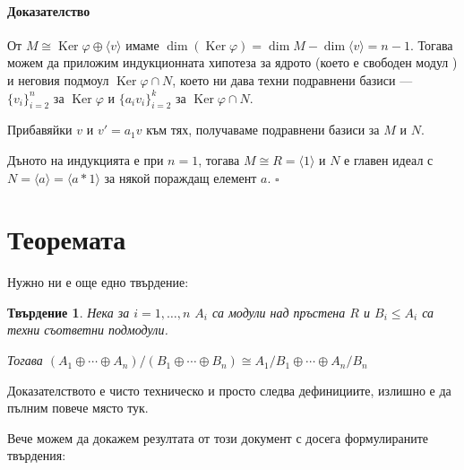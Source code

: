 \documentclass{article}
\newif\ifusemulticols
\theoremstyle{definition}
\theoremstyle{remark}
\theoremstyle{plain}
\theoremstyle{plain}
\newtheorem{prop}[theorem]{Твърдение}
\newenvironment{mymulticols}
    { \ifusemulticols \begin{multicols}{2} \fi }
    { \ifusemulticols \end{multicols} \fi }
\newenvironment{myproof}{\paragraph{Доказателство}}{\hfill$\square$}
\DeclareMathOperator{\Ker}{Ker}
\begin{document}
\begin{mymulticols}
\begin{myproof}
    От $M \cong \Ker \varphi \oplus \langle v \rangle$ имаме $\dim(\Ker \varphi) = \dim
    M-\dim \langle v \rangle = n - 1$. Тогава можем да приложим индукционната хипотеза за ядрото
    (което е свободен модул%
    ) и
    неговия подмоул $\Ker \varphi \cap N$, което ни дава техни подравнени базиси --- $\{ v_i
    \}_{i=2}^n$ за $\Ker \varphi$ и $\{ a_i v_i \}_{i=2}^k$ за $\Ker \varphi \cap N$.

    Прибавяйки $v$ и $v' = a_1 v$ към тях, получаваме подравнени базиси за $M$ и $N$.

    Дъното на индукцията е при $n = 1$, тогава $M \cong R = \langle 1 \rangle$ и $N$ е главен идеал
    с $N = \langle a \rangle = \langle a * 1 \rangle$ за някой пораждащ елемент $a$.
\end{myproof}

\section{Теоремата}%
\label{sec:теоремата}

Нужно ни е още едно твърдение:
\begin{prop}
    Нека за $i = 1, \ldots, n$ $A_i$ са модули над пръстена $R$ и $B_i \le A_i$ са техни съответни
    подмодули.

    Тогава $(A_1 \oplus \cdots \oplus A_n)/(B_1 \oplus \cdots \oplus B_n) \cong A_1/B_1
    \oplus \cdots \oplus A_n/B_n$
\end{prop}

Доказателството е чисто техническо и просто следва дефинициите, излишно е да пълним повече място
тук.

Вече можем да докажем резултата от този документ с досега формулираните твърдения:


\end{mymulticols}
\end{document}
